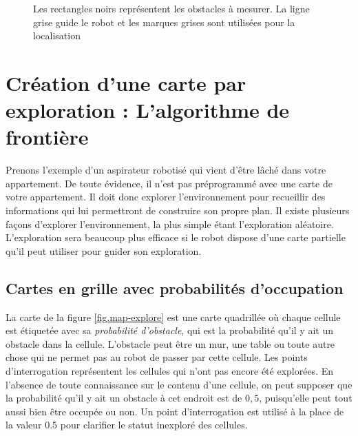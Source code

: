 \begin{figure}
\begin{center}
\end{center}
\caption{Les rectangles noirs représentent les obstacles à mesurer. La ligne grise guide le robot et les marques grises sont utilisées pour la localisation} \label{fig.mapping-activity}
\end{figure}

\section[L'algorithme de frontière]{Création d'une carte par exploration : L'algorithme de frontière} \label{s.map-create}

Prenons l'exemple d'un aspirateur robotisé qui vient d'être lâché dans votre appartement. De toute évidence, il n'est pas préprogrammé avec une carte de votre appartement. Il doit donc explorer l'environnement pour recueillir des informations qui lui permettront de construire son propre plan. Il existe plusieurs façons d'explorer l'environnement, la plus simple étant l'exploration aléatoire. L'exploration sera beaucoup plus efficace si le robot dispose d'une carte partielle qu'il peut utiliser pour guider son exploration.

\subsection{Cartes en grille avec probabilités d'occupation}

La carte de la figure \ref{fig.map-explore} est une carte quadrillée où chaque cellule est étiquetée avec sa \emph{probabilité d'obstacle}, qui est la probabilité qu'il y ait un obstacle dans la cellule. L'obstacle peut être un mur, une table ou toute autre chose qui ne permet pas au robot de passer par cette cellule. Les points d'interrogation représentent les cellules qui n'ont pas encore été explorées. En l'absence de toute connaissance sur le contenu d'une cellule, on peut supposer que la probabilité qu'il y ait un obstacle à cet endroit est de $0,5$, puisqu'elle peut tout aussi bien être occupée ou non. Un point d'interrogation est utilisé à la place de la valeur $0.5$ pour clarifier le statut inexploré des cellules.

